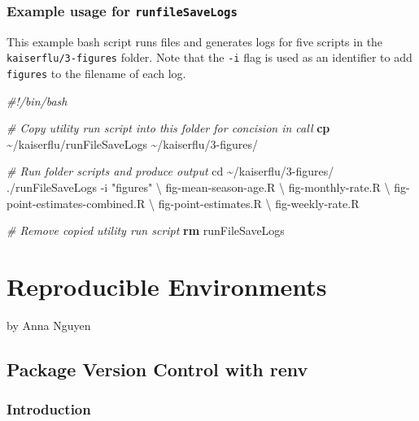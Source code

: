 \documentclass[
]{book}
\newenvironment{Shaded}{\begin{snugshade}}{\end{snugshade}}
\newcommand{\AttributeTok}[1]{\textcolor[rgb]{0.13,0.29,0.53}{#1}}
\newcommand{\BuiltInTok}[1]{#1}
\newcommand{\CommentTok}[1]{\textcolor[rgb]{0.56,0.35,0.01}{\textit{#1}}}
\newcommand{\DataTypeTok}[1]{\textcolor[rgb]{0.13,0.29,0.53}{#1}}
\newcommand{\ExtensionTok}[1]{#1}
\newcommand{\FunctionTok}[1]{\textcolor[rgb]{0.13,0.29,0.53}{\textbf{#1}}}
\newcommand{\NormalTok}[1]{#1}
\newcommand{\StringTok}[1]{\textcolor[rgb]{0.31,0.60,0.02}{#1}}
\begin{document}
\subsection{\texorpdfstring{Example usage for \texttt{runfileSaveLogs}}{Example usage for runfileSaveLogs}}\label{example-usage-for-runfilesavelogs}

This example bash script runs files and generates logs for five scripts in the \texttt{kaiserflu/3-figures} folder. Note that the \texttt{-i} flag is used as an identifier to add \texttt{figures} to the filename of each log.

\begin{Shaded}
\begin{Highlighting}[]
\CommentTok{\#!/bin/bash}

\CommentTok{\# Copy utility run script into this folder for concision in call}
\FunctionTok{cp}\NormalTok{ \textasciitilde{}/kaiserflu/runFileSaveLogs \textasciitilde{}/kaiserflu/3{-}figures/}

\CommentTok{\# Run folder scripts and produce output}
\BuiltInTok{cd}\NormalTok{ \textasciitilde{}/kaiserflu/3{-}figures/}
\ExtensionTok{./runFileSaveLogs} \AttributeTok{{-}i} \StringTok{"figures"} \DataTypeTok{\textbackslash{}}
\NormalTok{fig{-}mean{-}season{-}age.R }\DataTypeTok{\textbackslash{}}
\NormalTok{fig{-}monthly{-}rate.R }\DataTypeTok{\textbackslash{}}
\NormalTok{fig{-}point{-}estimates{-}combined.R }\DataTypeTok{\textbackslash{}}
\NormalTok{fig{-}point{-}estimates.R }\DataTypeTok{\textbackslash{}}
\NormalTok{fig{-}weekly{-}rate.R}

\CommentTok{\# Remove copied utility run script}
\FunctionTok{rm}\NormalTok{ runFileSaveLogs}
\end{Highlighting}
\end{Shaded}

\chapter{Reproducible Environments}\label{reproducible-environments}

by Anna Nguyen

\section{Package Version Control with renv}\label{package-version-control-with-renv}

\subsection{Introduction}\label{introduction}
\end{document}
